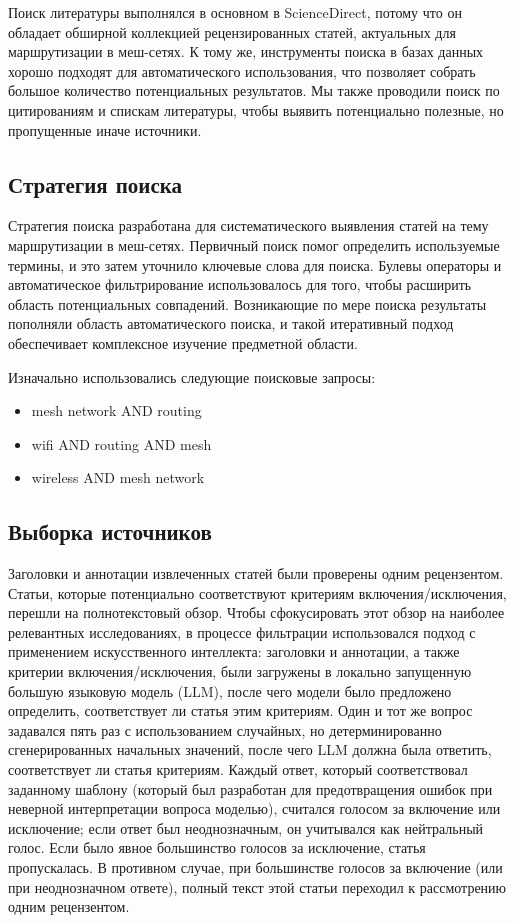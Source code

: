 \documentclass[%
]{report}
\begin{document}
Поиск литературы выполнялся в основном в ScienceDirect,
потому что он обладает обширной коллекцией рецензированных статей,
актуальных для маршрутизации в меш-сетях.
К тому же, инструменты поиска в базах данных хорошо подходят для
автоматического использования,
что позволяет собрать большое количество потенциальных результатов.
Мы также проводили поиск по цитированиям и спискам литературы,
чтобы выявить потенциально полезные,
но пропущенные иначе источники.

\subsection{Стратегия поиска}\label{search-strategy}

Стратегия поиска разработана для систематического
выявления статей на тему маршрутизации в меш-сетях.
Первичный поиск помог определить используемые термины,
и это затем уточнило ключевые слова для поиска.
Булевы операторы и автоматическое фильтрирование
использовалось для того, чтобы расширить область потенциальных совпадений.
Возникающие по мере поиска результаты пополняли область автоматического поиска,
и такой итеративный подход обеспечивает комплексное изучение предметной области.

Изначально использовались следующие поисковые запросы:

\begin{itemize}
\item
  mesh network AND routing
\item
  wifi AND routing AND mesh
\item
  wireless AND mesh network
\end{itemize}

\subsection{Выборка источников}\label{selection-of-sources-of-evidence}

Заголовки и аннотации извлеченных статей
были проверены одним рецензентом. Статьи,
которые потенциально соответствуют критериям включения/исключения,
перешли на полнотекстовый обзор.
Чтобы сфокусировать этот обзор на наиболее
релевантных исследованиях,
в процессе фильтрации использовался подход
с применением искусственного интеллекта:
заголовки и аннотации, а также
критерии включения/исключения, были загружены
в локально запущенную большую языковую модель (LLM),
после чего модели было предложено определить,
соответствует ли статья этим критериям.
Один и тот же вопрос задавался пять раз
с использованием случайных,
но детерминированно сгенерированных начальных значений,
после чего LLM должна была ответить,
соответствует ли статья критериям.
Каждый ответ, который соответствовал заданному шаблону
(который был разработан для предотвращения ошибок
при неверной интерпретации вопроса моделью),
считался голосом за включение или исключение;
если ответ был неоднозначным,
он учитывался как нейтральный голос.
Если было явное большинство голосов за исключение,
статья пропускалась.
В противном случае, при большинстве голосов за включение
(или при неоднозначном ответе),
полный текст этой статьи переходил к рассмотрению одним рецензентом.
\end{document}
